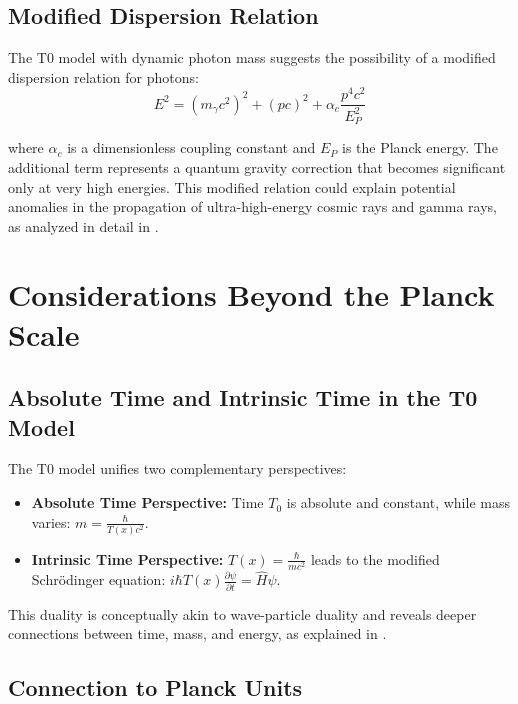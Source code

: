 \documentclass[12pt,a4paper]{article}
\newcommand{\Tfield}{T(x)}
\newcommand{\Tzero}{T_0}
\begin{document}
	\subsection{Modified Dispersion Relation}
	\label{subsec:modified_dispersion}
	
	The T0 model with dynamic photon mass suggests the possibility of a modified dispersion relation for photons:
	\begin{equation}
		E^2 = (m_{\gamma} c^2)^2 + (p c)^2 + \alpha_c \frac{p^4 c^2}{E_P^2}
	\end{equation}
	
	where \(\alpha_c\) is a dimensionless coupling constant and \(E_P\) is the Planck energy. The additional term represents a quantum gravity correction that becomes significant only at very high energies. This modified relation could explain potential anomalies in the propagation of ultra-high-energy cosmic rays and gamma rays, as analyzed in detail in \cite{pascher_photons_2025}.
	
	\section{Considerations Beyond the Planck Scale}
	\label{sec:beyond_planck}
	
	\subsection{Absolute Time and Intrinsic Time in the T0 Model}
	\label{subsec:absolute_intrinsic}
	
	The T0 model unifies two complementary perspectives:
	\begin{itemize}
		\item \textbf{Absolute Time Perspective:} Time \(\Tzero\) is absolute and constant, while mass varies: \(m = \frac{\hbar}{\Tfield c^2}\).
		\item \textbf{Intrinsic Time Perspective:} \(\Tfield = \frac{\hbar}{m c^2}\) leads to the modified Schrödinger equation: \(i\hbar \Tfield \frac{\partial \psi}{\partial t} = \hat{H} \psi\).
	\end{itemize}
	
	This duality is conceptually akin to wave-particle duality and reveals deeper connections between time, mass, and energy, as explained in \cite{pascher_zeit_2025}.
	
	\subsection{Connection to Planck Units}
	\label{subsec:planck_connection}
	
\end{document}
